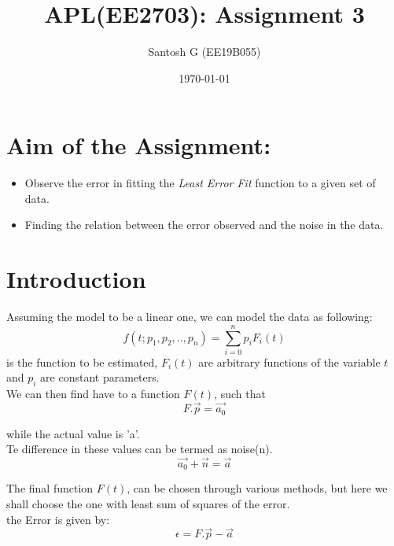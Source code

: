 \documentclass[11pt, a4paper]{article}
\title{APL(EE2703): Assignment 3} %
\author{Santosh G  (EE19B055)} %
\date{\today} %
\begin{document}
    \maketitle %

    \section{Aim of the Assignment:}
        \begin{itemize}
            \item Observe the error in fitting the \textit{Least Error Fit} function to a given set of data.
            \item Finding the relation between the error observed and the noise in the data.
        \end{itemize}
    \section{Introduction}
        Assuming the model to be a linear one, we can model the data as following:
        \begin{equation}
            f(t;p_1, p_2,..,p_n) = \sum_{i=0}^{n}p_iF_i(t)
        \end{equation}
        is the function to be estimated, $F_i(t)$ are arbitrary functions of the variable $t$ and $p_i$ are constant parameters.\\

         We can then find  have to a function $F(t)$, such that  
         \begin{equation}
            F.\vec{p} = \vec{a_0}
            \label{eqwithoutnoise}
        \end{equation}
         
         while the actual value is 'a'.\\

        Te difference in these values can be termed as noise(n).\\
        \begin{equation}
            \vec{a_0}+\vec{n} = \vec{a}
            \label{truenoiseeqn}
        \end{equation}
     
        The final function $F(t)$, can be chosen through various methods, but here we shall choose the one with least sum of squares of the error.\\
        the Error is given by:\\
        \begin{equation}
            \epsilon = F.\vec{p} - \vec{a}
        \end{equation}
        
\end{document}
